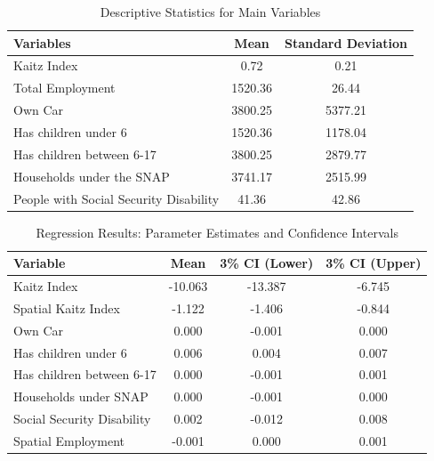 \documentclass[12pt]{article}
\begin{document}
\begin{table}[H]
	\centering
	\begin{tabular}{lcc}
		\toprule
		\textbf{Variables}                     & \textbf{Mean} & \textbf{Standard Deviation} \\
		\midrule
		Kaitz Index                            & 0.72          & 0.21                        \\
		Total Employment                       & 1520.36       & 26.44                       \\
		Own Car                                & 3800.25       & 5377.21                     \\
		Has children under 6                   & 1520.36       & 1178.04                     \\
		Has children between 6-17              & 3800.25       & 2879.77                     \\
		Households under the SNAP              & 3741.17       & 2515.99                     \\
		People with Social Security Disability & 41.36         & 42.86                       \\
		\bottomrule
	\end{tabular}
	\caption{Descriptive Statistics for Main Variables}
\end{table}

\begin{table}[H]
	\centering
	\begin{tabular}{lccc}
		\toprule
		\textbf{Variable}          & \textbf{Mean} & \textbf{3\% CI (Lower)} & \textbf{3\% CI (Upper)} \\
		\midrule
		Kaitz Index                & -10.063       & -13.387                 & -6.745                  \\
		Spatial Kaitz Index        & -1.122        & -1.406                  & -0.844                  \\
		Own Car                    & 0.000         & -0.001                  & 0.000                   \\
		Has children under 6       & 0.006         & 0.004                   & 0.007                   \\
		Has children between 6-17  & 0.000         & -0.001                  & 0.001                   \\
		Households under SNAP      & 0.000         & -0.001                  & 0.000                   \\
		Social Security Disability & 0.002         & -0.012                  & 0.008                   \\
		Spatial Employment         & -0.001        & 0.000                   & 0.001                   \\
		\bottomrule
	\end{tabular}
	\caption{Regression Results: Parameter Estimates and Confidence Intervals}
\end{table}
\end{document}
